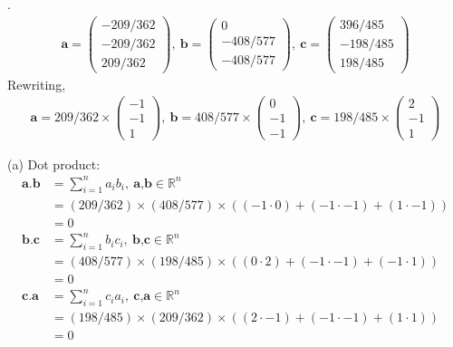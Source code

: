 \documentclass[12pt,letterpaper,fleqn]{article}
\theoremstyle{definition}
\begin{document}
. 
\begin{align*}
\textbf{a} = 
\begin{pmatrix}
-209/362\\
-209/362\\
209/362
\end{pmatrix},~
\textbf{b} = 
\begin{pmatrix}
0\\
-408/577\\
-408/577
\end{pmatrix},~
\textbf{c} = 
\begin{pmatrix}
396/485\\
-198/485\\
198/485
\end{pmatrix}
\end{align*}
Rewriting,
\begin{equation*}
\begin{split}
\textbf{a} = 209/362 \times
\begin{pmatrix}
-1\\
-1\\
1
\end{pmatrix},~
\textbf{b} = 408/577 \times
\begin{pmatrix}
0\\
-1\\
-1
\end{pmatrix},~
\textbf{c} = 198/485 \times
\begin{pmatrix}
2\\
-1\\
1
\end{pmatrix}
\end{split}
\end{equation*}


(a) Dot product:
\begin{equation*}
\begin{split}
\textbf{a.b} &= \sum_{i=1}^{n} a_i b_i,~ \textbf{a,b} \in \mathbb{R}^n\\
 &= (209/362) \times (408/577) \times ((-1\cdot0) + (-1\cdot-1) + (1\cdot-1))\\
&= 0\\
\textbf{b.c} &= \sum_{i=1}^{n} b_i c_i,~ \textbf{b,c} \in \mathbb{R}^n\\
 &= (408/577) \times (198/485) \times ((0\cdot2) + (-1\cdot-1) + (-1\cdot1))\\
&= 0\\
\textbf{c.a} &= \sum_{i=1}^{n} c_i a_i,~ \textbf{c,a} \in \mathbb{R}^n\\
 &= (198/485) \times (209/362) \times ((2\cdot-1) + (-1\cdot-1) + (1\cdot1))\\
&= 0
\end{split}
\end{equation*}
\end{document}
